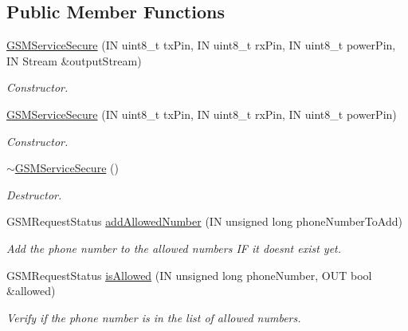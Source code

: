 \subsection*{Public Member Functions}
\begin{DoxyCompactItemize}
\item 
\hyperlink{class_easyuino_1_1_g_s_m_service_secure_ab28bad6e7765f61851a3957edc5d3071}{G\+S\+M\+Service\+Secure} (IN uint8\+\_\+t tx\+Pin, IN uint8\+\_\+t rx\+Pin, IN uint8\+\_\+t power\+Pin, IN Stream \&output\+Stream)
\begin{DoxyCompactList}\small\item\em Constructor. \end{DoxyCompactList}\item 
\hyperlink{class_easyuino_1_1_g_s_m_service_secure_a4331122e2c6e42711eb13bf59cfd940c}{G\+S\+M\+Service\+Secure} (IN uint8\+\_\+t tx\+Pin, IN uint8\+\_\+t rx\+Pin, IN uint8\+\_\+t power\+Pin)
\begin{DoxyCompactList}\small\item\em Constructor. \end{DoxyCompactList}\item 
\mbox{\label{class_easyuino_1_1_g_s_m_service_secure_ac66e15322e754c5ee56d022842f7a205}} 
\hyperlink{class_easyuino_1_1_g_s_m_service_secure_ac66e15322e754c5ee56d022842f7a205}{$\sim$\+G\+S\+M\+Service\+Secure} ()
\begin{DoxyCompactList}\small\item\em Destructor. \end{DoxyCompactList}\item 
G\+S\+M\+Request\+Status \hyperlink{class_easyuino_1_1_g_s_m_service_secure_a7acbf1d460ef1b81bcd36d852b596af3}{add\+Allowed\+Number} (IN unsigned long phone\+Number\+To\+Add)
\begin{DoxyCompactList}\small\item\em Add the phone number to the allowed numbers IF it doesn\textquotesingle{}t exist yet. \end{DoxyCompactList}\item 
G\+S\+M\+Request\+Status \hyperlink{class_easyuino_1_1_g_s_m_service_secure_a791dd872fe2c72311d84219616e5f54c}{is\+Allowed} (IN unsigned long phone\+Number, O\+UT bool \&allowed)
\begin{DoxyCompactList}\small\item\em Verify if the phone number is in the list of allowed numbers. \end{DoxyCompactList}\item 

\end{DoxyCompactItemize}
